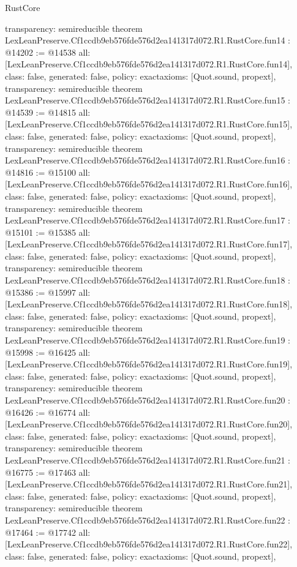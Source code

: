 \begin{lexlean}{RustCore}
\begin{coremodule}
{  transparency: semireducible
}
theorem LexLeanPreserve.Cf1ccdb9eb576fde576d2ea141317d072.R1.RustCore.fun14 : @14202 := @14538 {
  all: [LexLeanPreserve.Cf1ccdb9eb576fde576d2ea141317d072.R1.RustCore.fun14],
  class: false,
  generated: false,
  policy: exact{axioms: [Quot.sound, propext]},
  transparency: semireducible
}
theorem LexLeanPreserve.Cf1ccdb9eb576fde576d2ea141317d072.R1.RustCore.fun15 : @14539 := @14815 {
  all: [LexLeanPreserve.Cf1ccdb9eb576fde576d2ea141317d072.R1.RustCore.fun15],
  class: false,
  generated: false,
  policy: exact{axioms: [Quot.sound, propext]},
  transparency: semireducible
}
theorem LexLeanPreserve.Cf1ccdb9eb576fde576d2ea141317d072.R1.RustCore.fun16 : @14816 := @15100 {
  all: [LexLeanPreserve.Cf1ccdb9eb576fde576d2ea141317d072.R1.RustCore.fun16],
  class: false,
  generated: false,
  policy: exact{axioms: [Quot.sound, propext]},
  transparency: semireducible
}
theorem LexLeanPreserve.Cf1ccdb9eb576fde576d2ea141317d072.R1.RustCore.fun17 : @15101 := @15385 {
  all: [LexLeanPreserve.Cf1ccdb9eb576fde576d2ea141317d072.R1.RustCore.fun17],
  class: false,
  generated: false,
  policy: exact{axioms: [Quot.sound, propext]},
  transparency: semireducible
}
theorem LexLeanPreserve.Cf1ccdb9eb576fde576d2ea141317d072.R1.RustCore.fun18 : @15386 := @15997 {
  all: [LexLeanPreserve.Cf1ccdb9eb576fde576d2ea141317d072.R1.RustCore.fun18],
  class: false,
  generated: false,
  policy: exact{axioms: [Quot.sound, propext]},
  transparency: semireducible
}
theorem LexLeanPreserve.Cf1ccdb9eb576fde576d2ea141317d072.R1.RustCore.fun19 : @15998 := @16425 {
  all: [LexLeanPreserve.Cf1ccdb9eb576fde576d2ea141317d072.R1.RustCore.fun19],
  class: false,
  generated: false,
  policy: exact{axioms: [Quot.sound, propext]},
  transparency: semireducible
}
theorem LexLeanPreserve.Cf1ccdb9eb576fde576d2ea141317d072.R1.RustCore.fun20 : @16426 := @16774 {
  all: [LexLeanPreserve.Cf1ccdb9eb576fde576d2ea141317d072.R1.RustCore.fun20],
  class: false,
  generated: false,
  policy: exact{axioms: [Quot.sound, propext]},
  transparency: semireducible
}
theorem LexLeanPreserve.Cf1ccdb9eb576fde576d2ea141317d072.R1.RustCore.fun21 : @16775 := @17463 {
  all: [LexLeanPreserve.Cf1ccdb9eb576fde576d2ea141317d072.R1.RustCore.fun21],
  class: false,
  generated: false,
  policy: exact{axioms: [Quot.sound, propext]},
  transparency: semireducible
}
theorem LexLeanPreserve.Cf1ccdb9eb576fde576d2ea141317d072.R1.RustCore.fun22 : @17464 := @17742 {
  all: [LexLeanPreserve.Cf1ccdb9eb576fde576d2ea141317d072.R1.RustCore.fun22],
  class: false,
  generated: false,
  policy: exact{axioms: [Quot.sound, propext]},
}
\end{coremodule}
\end{lexlean}
